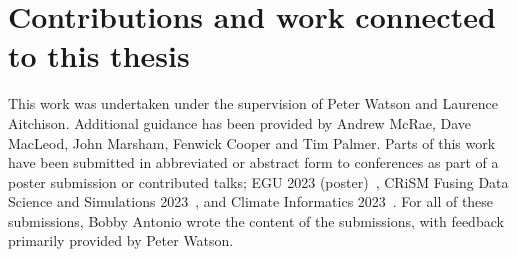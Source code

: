 \documentclass[../main.tex]{subfiles}
\begin{document}
\section{Contributions and work connected to this thesis}

This work was undertaken under the supervision of Peter Watson and Laurence Aitchison. Additional guidance has been provided by Andrew McRae, Dave MacLeod, John Marsham, Fenwick Cooper and Tim Palmer. Parts of this work have been submitted in abbreviated or abstract form to conferences as part of a poster submission or contributed talks; EGU 2023 (poster)~\citep{antonio_improving_2023}, CRiSM Fusing Data Science and Simulations 2023~\citep{antonio_post-processing_2023}, and Climate Informatics 2023~\citep{antonio_post-processing_2023-1}. For all of these submissions, Bobby Antonio wrote the content of the submissions, with feedback primarily provided by Peter Watson.



\ifSubfilesClassLoaded{%
    
    

}{}
\end{document}
